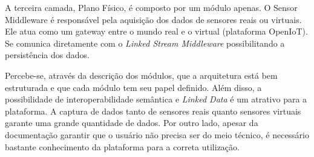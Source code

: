 A terceira camada, Plano Físico, é composto por um módulo apenas. O Sensor
Middleware é responsável pela aquisição dos dados de sensores reais ou
virtuais. Ele atua como um gateway entre o mundo real e o virtual (plataforma
OpenIoT). Se comunica diretamente com o \textit{Linked Stream Middleware}
possibilitando a persistência dos dados.

Percebe-se, através da descrição dos módulos, que a arquitetura está bem
estruturada e que cada módulo tem seu papel definido. Além disso, a
possibilidade de interoperabilidade semântica e \textit{Linked Data} é um
atrativo para a plataforma. A captura de dados tanto de sensores reais quanto
sensores virtuais garante uma grande quantidade de dados. Por outro lado,
apesar da documentação garantir que o usuário não precisa ser do meio técnico,
é necessário bastante conhecimento da plataforma para a correta utilização. 























